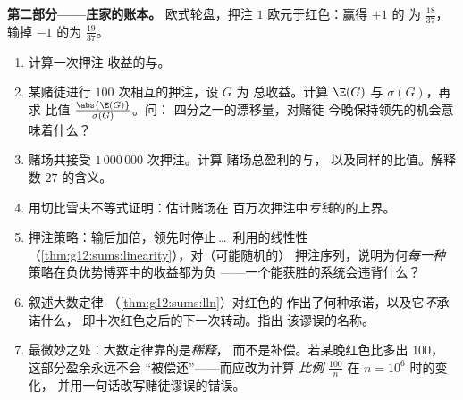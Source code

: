 \begin{problem}
\medskip
\noindent\textbf{第二部分——庄家的账本。}
欧式轮盘，押注 $1$ 欧元于红色：赢得 $+1$ 的
为 $\frac{18}{37}$，输掉 $-1$ 的为
$\frac{19}{37}$。
\begin{enumerate}[resume]
  \item 计算一次押注
        收益的与。
  \item 某赌徒进行 $100$ 次相互的押注，设 $G$ 为
        总收益。计算 $\E(G)$ 与 $\sigma(G)$，再求
        比值 $\frac{\abs{\E(G)}}{\sigma(G)}$。问：
        四分之一的漂移量，对赌徒
        今晚保持领先的机会意味着什么？
  \item 赌场共接受 $1\,000\,000$ 次押注。计算
        赌场总盈利的与，
        以及同样的比值。解释数 $27$ 的含义。
  \item 用切比雪夫不等式证明：估计赌场在
        百万次押注中\emph{亏钱}的的上界。
  \item 押注策略：输后加倍，领先时停止\,\dots\
        利用的线性性
        （\cref{thm:g12:sums:linearity}），对（可能随机的）
        押注序列，说明为何\emph{每一种}
        策略在负优势博弈中的收益都为负
        ——一个能获胜的系统会违背什么？
  \item 叙述大数定律
        （\cref{thm:g12:sums:lln}）对红色的
        作出了何种承诺，以及它\emph{不}承诺什么，
        即十次红色之后的下一次转动。指出
        该谬误的名称。
  \item 最微妙之处：大数定律靠的是\emph{稀释}，
        而不是补偿。若某晚红色比多出 $100$，
        这部分盈余永远不会
        “被偿还”——而应改为计算
        \emph{比例} $\frac{100}{n}$ 在 $n = 10^6$ 时的变化，
        并用一句话改写赌徒谬误的错误。
\end{enumerate}


\end{problem}
